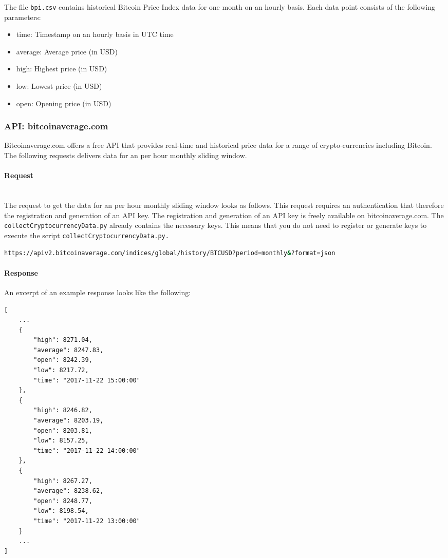 \documentclass[a4paper,12pt]{article}
\begin{document}
\begin{spacing}{1.2}
The file \verb|bpi.csv| contains historical Bitcoin Price Index data for one month on an hourly basis. Each data point consists of the following parameters:
\begin{itemize}
    \item time: Timestamp on an hourly basis in UTC time
    \item average: Average price (in USD)
    \item high: Highest price (in USD)
    \item low: Lowest price (in USD)
    \item open: Opening price (in USD)
\end{itemize}

\subsubsection{API: bitcoinaverage.com}
Bitcoinaverage.com offers a free API that provides real-time and historical price data for a range of crypto-currencies including Bitcoin. The following requests delivers data for an per hour monthly sliding window.

\paragraph{Request}\mbox{}\\
The request to get the data for an per hour monthly sliding window looks as follows. This request requires an authentication that therefore the registration and generation of an API key. The registration and generation of an API key is freely available on bitcoinaverage.com. The \verb|collectCryptocurrencyData.py| already contains the necessary keys. This means that you do not need to register or generate keys to execute the script \verb|collectCryptocurrencyData.py.| 
\begin{lstlisting}[language=bash]
https://apiv2.bitcoinaverage.com/indices/global/history/BTCUSD?period=monthly&?format=json
\end{lstlisting}

\paragraph{Response}
An excerpt of an example response looks like the following:
\begin{lstlisting}
[
    ...
    {
        "high": 8271.04, 
        "average": 8247.83, 
        "open": 8242.39,
        "low": 8217.72, 
        "time": "2017-11-22 15:00:00"
    }, 
    {
        "high": 8246.82,
        "average": 8203.19,
        "open": 8203.81,
        "low": 8157.25,
        "time": "2017-11-22 14:00:00"
    }, 
    {
        "high": 8267.27, 
        "average": 8238.62, 
        "open": 8248.77, 
        "low": 8198.54, 
        "time": "2017-11-22 13:00:00"
    }
    ...
]
\end{lstlisting}


\end{spacing}
\end{document}

